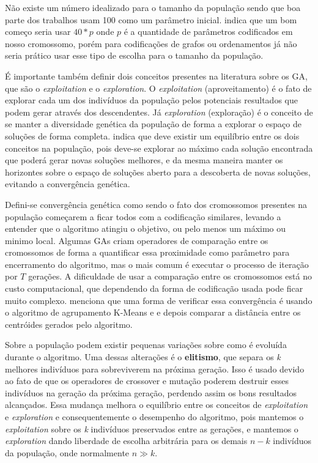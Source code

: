 Não existe um número idealizado para o tamanho da população sendo que boa parte dos trabalhos usam 100 como um parâmetro inicial. \citeauthor{Linden2008} indica que um bom começo seria usar \(40 * p\) onde \(p\) é a quantidade de parâmetros codificados em nosso cromossomo, porém para codificações de grafos ou ordenamentos já não seria prático usar esse tipo de escolha para o tamanho da população.

É importante também definir dois conceitos presentes na literatura sobre os GA, que são o \textit{exploitation} e o \textit{exploration}. O \textit{exploitation} (aproveitamento) é o fato de explorar cada um dos indivíduos da população pelos potenciais resultados que podem gerar através dos descendentes. Já \textit{exploration} (exploração) é o conceito de se manter a diversidade genética da população de forma a explorar o espaço de soluções de forma completa. \citeauthor{Holland1992} indica que deve existir um equilíbrio entre os dois conceitos na população, pois deve-se explorar ao máximo cada solução encontrada que poderá gerar novas soluções melhores, e da mesma maneira manter os horizontes sobre o espaço de soluções aberto para a descoberta de novas soluções, evitando a convergência genética.

Defini-se convergência genética como sendo o fato dos cromossomos presentes na população começarem a ficar todos com a codificação similares, levando a entender que o algoritmo atingiu o objetivo, ou pelo menos um máximo ou minimo local. Algumas GAs criam operadores de comparação entre os cromossomos de forma a quantificar essa proximidade como parâmetro para encerramento do algoritmo, mas o mais comum é executar o processo de iteração por \(T\) gerações. A dificuldade de usar a comparação entre os cromossomos está no custo computacional, que dependendo da forma de codificação usada pode ficar muito complexo. \citeauthor{Linden2008} menciona que uma forma de verificar essa convergência é usando o algoritmo de agrupamento K-Means e e depois comparar a distância entre os centróides gerados pelo algoritmo.

Sobre a população podem existir pequenas variações sobre como é evoluída durante o algoritmo. Uma dessas alterações é o \textbf{elitismo}, que separa os \textit{k} melhores indivíduos para sobreviverem na próxima geração. Isso é usado devido ao fato de que os operadores de crossover e mutação poderem destruir esses indivíduos na geração da próxima geração, perdendo assim os bons resultados alcançados. Essa mudança melhora o equilíbrio entre os conceitos de \textit{exploitation} e \textit{exploration} e consequentemente o desempenho do algoritmo, pois mantemos o \textit{exploitation} sobre os \textit{k} indivíduos preservados entre as gerações, e mantemos o \textit{exploration} dando liberdade de escolha arbitrária para os demais \(n-k\) indivíduos da população, onde normalmente \(n \gg k\). 

